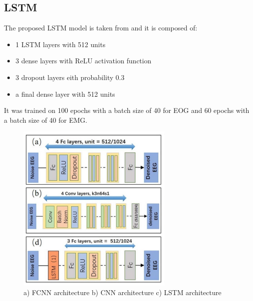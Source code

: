 \documentclass[a4paper]{sapthesis}
\begin{document}
\subsection{LSTM}\label{sec:model_lstm}
The proposed LSTM model is taken from\cite{EEGdenoiseNet} and it is 
composed of: 
\begin{itemize}
\item 1 LSTM layers with 512 units
\item 3 dense layers with ReLU activation function
\item 3 dropout layers eith probability 0.3
\item a final dense layer with 512 units
\end{itemize}
It was trained on 100 epochs with a batch size of 40 for EOG and 
60 epochs with a batch size of 40 for EMG.
\begin{figure}
\centering
\includegraphics[width=0.6\linewidth]{images/models_architecture_basic.png}
\caption{a) FCNN architecture b) CNN architecture c) LSTM architecture}
\end{figure}
\end{document}
